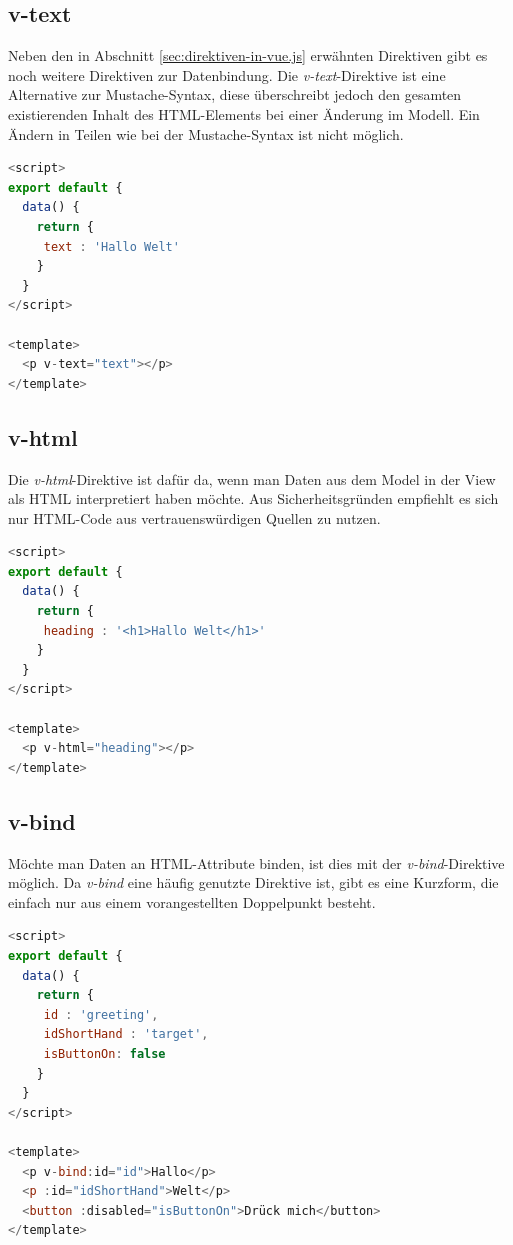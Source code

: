 \subsection*{v-text}
Neben den in Abschnitt \ref{sec:direktiven-in-vue.js}
erwähnten Direktiven gibt es noch weitere Direktiven zur Datenbindung.
Die \emph{v-text}-Direktive ist eine Alternative zur Mustache-Syntax,
diese überschreibt jedoch den gesamten existierenden Inhalt des HTML-Elements bei einer Änderung im Modell.
Ein Ändern in Teilen wie bei der Mustache-Syntax ist nicht möglich. \cite{vueDirectives}
\begin{lstlisting}[caption={\emph{v-text}-Direktive},language=javascript, label={lst:v-text-Direktive}]
<script>
export default {
  data() {
    return {
     text : 'Hallo Welt'
    }
  }
</script>

<template>
  <p v-text="text"></p>
</template>
\end{lstlisting}

\subsection*{v-html}
Die \emph{v-html}-Direktive ist dafür da, wenn man Daten aus dem Model in der View als HTML interpretiert haben möchte.
Aus Sicherheitsgründen empfiehlt es sich nur HTML-Code aus vertrauenswürdigen Quellen zu nutzen. \cite{vueTemplateSyntax}
\begin{lstlisting}[caption={\emph{v-html}-Direktive},language=javascript, label={lst:v-html-Direktive}]
<script>
export default {
  data() {
    return {
     heading : '<h1>Hallo Welt</h1>'
    }
  }
</script>

<template>
  <p v-html="heading"></p>
</template>
\end{lstlisting}

\subsection*{v-bind}
Möchte man Daten an HTML-Attribute binden, ist dies mit der \emph{v-bind}-Direktive möglich.
Da \emph{v-bind} eine häufig genutzte Direktive ist, gibt es eine Kurzform,
die einfach nur aus einem vorangestellten Doppelpunkt besteht. \cite{vueTemplateSyntax}
\begin{lstlisting}[caption={\emph{v-bind}-Direktive},language=javascript, label={lst:v-bind-Direktive}]
<script>
export default {
  data() {
    return {
     id : 'greeting',
     idShortHand : 'target',
     isButtonOn: false
    }
  }
</script>

<template>
  <p v-bind:id="id">Hallo</p>
  <p :id="idShortHand">Welt</p>
  <button :disabled="isButtonOn">Drück mich</button>
</template>
\end{lstlisting}

